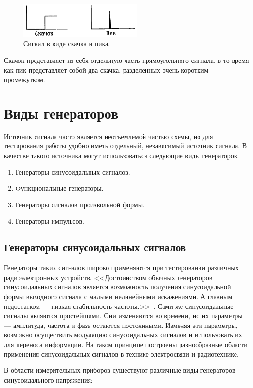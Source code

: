 	\begin{figure}[H]
    \centering
    \includegraphics[width=0.55\textwidth]{../image/s_sp.png}
    \caption{Сигнал в виде скачка и пика.}
	\end{figure}

Скачок представляет из себя отдельную часть прямоугольного сигнала, в то время как пик представляет собой два скачка, разделенных очень коротким промежутком.


\section{Виды генераторов}
Источник сигнала часто является неотъемлемой частью схемы, но для тестирования работы удобно иметь отдельный, независимый источник сигнала. В качестве такого источника могут использоваться следующие виды генераторов.
\begin{enumerate}
	\item Генераторы синусоидальных сигналов.
	\item Функциональные генераторы.
	\item Генераторы сигналов произвольной формы.
	\item Генераторы импульсов.
\end{enumerate}

\subsection{Генераторы синусоидальных сигналов}
Генераторы таких сигналов широко применяются при тестировании различных радиоэлектронных устройств. <<Достоинством обычных генераторов синусоидальных сигналов является возможность получения синусоидальной формы выходного сигнала с малыми нелинейными искажениями. А главным недостатком — низкая стабильность частоты.>>~\cite{dgs}. Сами же синусоидальные сигналы являются простейшими. Они изменяются во времени, но их параметры --- амплитуда, частота и фаза остаются постоянными. Изменяя эти параметры, возможно осуществить модуляцию синусоидальных сигналов и использовать их для переноса информации. На таком принципе построены разнообразные области применения синусоидальных сигналов в технике электросвязи и радиотехнике.

В области измерительных приборов существуют различные виды генераторов синусоидального напряжения:

